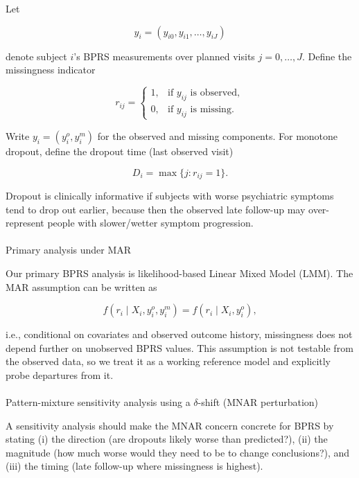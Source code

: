 \documentclass[
  9pt,
  letterpaper,
  DIV=11,
  numbers=noendperiod]{scrartcl}
\makeatletter
\let\oldparagraph\paragraph
\renewcommand{\paragraph}{
    \@ifstar
      \xxxParagraphStar
      \xxxParagraphNoStar
  }
\newcommand{\xxxParagraphStar}[1]{\oldparagraph*{#1}\mbox{}}
\newcommand{\xxxParagraphNoStar}[1]{\oldparagraph{#1}\mbox{}}
\makeatother
\begin{document}
Let

\[
y_i=(y_{i0},y_{i1},\dots,y_{iJ})
\]

denote subject \(i\)'s BPRS measurements over planned visits
\(j=0,\dots,J\). Define the missingness indicator

\[
r_{ij}=
\begin{cases}
1, & \text{if } y_{ij}\text{ is observed},\\
0, & \text{if } y_{ij}\text{ is missing}.
\end{cases}
\]

Write \(y_i=(y_i^{o},y_i^{m})\) for the observed and missing components.
For monotone dropout, define the dropout time (last observed visit)

\[
D_i=\max\{j:r_{ij}=1\}.
\]

Dropout is clinically informative if subjects with worse psychiatric
symptoms tend to drop out earlier, because then the observed late
follow-up may over-represent people with slower/wetter symptom
progression.

\paragraph{Primary analysis under MAR}\label{primary-analysis-under-mar}

Our primary BPRS analysis is likelihood-based Linear Mixed Model (LMM).
The MAR assumption can be written as

\[
f(r_i\mid X_i,y_i^{o},y_i^{m})=f(r_i\mid X_i,y_i^{o}),
\]

i.e., conditional on covariates and observed outcome history,
missingness does not depend further on unobserved BPRS values. This
assumption is not testable from the observed data, so we treat it as a
working reference model and explicitly probe departures from it.

\paragraph{\texorpdfstring{Pattern-mixture sensitivity analysis using a
\(\delta\)-shift (MNAR
perturbation)}{Pattern-mixture sensitivity analysis using a \textbackslash delta-shift (MNAR perturbation)}}\label{pattern-mixture-sensitivity-analysis-using-a-delta-shift-mnar-perturbation}

A sensitivity analysis should make the MNAR concern concrete for BPRS by
stating (i) the direction (are dropouts likely worse than predicted?),
(ii) the magnitude (how much worse would they need to be to change
conclusions?), and (iii) the timing (late follow-up where missingness is
highest).
\end{document}
